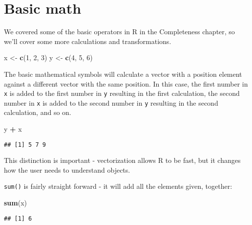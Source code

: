 \documentclass[
]{book}
\newenvironment{Shaded}{\begin{snugshade}}{\end{snugshade}}
\newcommand{\DecValTok}[1]{\textcolor[rgb]{0.00,0.00,0.81}{#1}}
\newcommand{\KeywordTok}[1]{\textcolor[rgb]{0.13,0.29,0.53}{\textbf{#1}}}
\newcommand{\NormalTok}[1]{#1}
\newcommand{\OperatorTok}[1]{\textcolor[rgb]{0.81,0.36,0.00}{\textbf{#1}}}
\newcommand{\StringTok}[1]{\textcolor[rgb]{0.31,0.60,0.02}{#1}}
\begin{document}
\hypertarget{basic-math}{%
\section{Basic math}\label{basic-math}}

We covered some of the basic operators in R in the Completeness chapter, so we'll cover some more calculations and transformations.

\begin{Shaded}
\begin{Highlighting}[]
\NormalTok{x <-}\StringTok{ }\KeywordTok{c}\NormalTok{(}\DecValTok{1}\NormalTok{, }\DecValTok{2}\NormalTok{, }\DecValTok{3}\NormalTok{)}
\NormalTok{y <-}\StringTok{ }\KeywordTok{c}\NormalTok{(}\DecValTok{4}\NormalTok{, }\DecValTok{5}\NormalTok{, }\DecValTok{6}\NormalTok{)}
\end{Highlighting}
\end{Shaded}

The basic mathematical symbols will calculate a vector with a position element against a different vector with the same position. In this case, the first number in \texttt{x} is added to the first number in \texttt{y} resulting in the first calculation, the second number in \texttt{x} is added to the second number in \texttt{y} resulting in the second calculation, and so on.

\begin{Shaded}
\begin{Highlighting}[]
\NormalTok{y }\OperatorTok{+}\StringTok{ }\NormalTok{x}
\end{Highlighting}
\end{Shaded}

\begin{verbatim}
## [1] 5 7 9
\end{verbatim}

This distinction is important - vectorization allows R to be fast, but it changes how the user needs to understand objects.

\texttt{sum()} is fairly straight forward - it will add all the elements given, together:

\begin{Shaded}
\begin{Highlighting}[]
\KeywordTok{sum}\NormalTok{(x)}
\end{Highlighting}
\end{Shaded}

\begin{verbatim}
## [1] 6
\end{verbatim}
\end{document}
